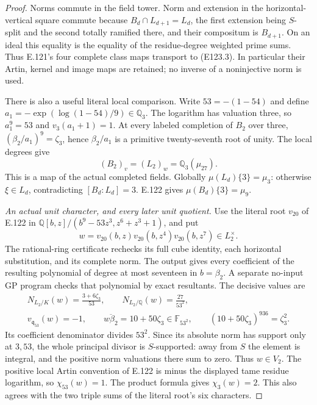 \begin{proof}
Norms commute in the field tower. Norm and extension in the
horizontal-vertical square commute because
$B_d\cap L_{d+1}=L_d$, the first extension being $S$-split
and the second totally ramified there, and their compositum is
$B_{d+1}$. On an ideal this equality is the equality of the
residue-degree weighted prime sums. Thus E.121's four complete
class maps transport to (E123.3). In particular their Artin,
kernel and image maps are retained; no inverse of a noninjective
norm is used.

There is also a useful literal local comparison. Write
$53=-(1-54)$ and define
$a_1=-\exp(\log(1-54)/9)\in\mathbb Q_3$.
The logarithm has valuation three, so $a_1^9=53$ and
$v_3(a_1+1)=1$. At every labeled completion of $B_2$ over three,
$(\beta_2/a_1)^9=\zeta_3$, hence $\beta_2/a_1$ is a primitive
twenty-seventh root of unity. The local degrees give
\[
            (B_2)_v=(L_2)_w=\mathbb Q_3(\mu_{27}).
 \tag{E123.16}
\]
This is a map of the actual completed fields. Globally
$\mu(L_d)\{3\}=\mu_3$: otherwise $\xi\in L_d$, contradicting
$[B_d:L_d]=3$. E.122 gives $\mu(B_d)\{3\}=\mu_9$.

\emph{An actual unit character, and every later unit quotient.}
Use the literal root $v_{20}$ of E.122 in
$\mathbb Q[b,z]/(b^9-53z^3,z^6+z^3+1)$, and put
\[
 w=v_{20}(b,z)v_{20}(b,z^4)v_{20}(b,z^7)\in L_2^\times.
 \tag{E123.17}
\]
The rational-ring certificate rechecks its full cube identity,
each horizontal substitution, and its complete norm. The output
gives every coefficient of the resulting polynomial of degree
at most seventeen in $b=\beta_2$. A separate no-input GP program
checks that polynomial by exact resultants. The decisive values are
\[
 \begin{gathered}
 N_{L_2/K}(w)=\frac{3+6\zeta_3}{53},\qquad
 N_{L_2/\mathbb Q}(w)=\frac{27}{53^2},\\
 v_{\mathfrak q_{53}}(w)=-1,\qquad
 \overline{w\beta_2}=10+50\zeta_3\in\mathbb F_{53^2},\qquad
 (10+50\zeta_3)^{936}=\zeta_3^2 .
 \end{gathered}
 \tag{E123.18}
\]
Its coefficient denominator divides $53^2$. Since its absolute
norm has support only at $3,53$, the whole principal divisor
is $S$-supported: away from $S$ the element is integral, and the
positive norm valuations there sum to zero. Thus $w\in V_2$.
The positive local Artin convention of E.122 is minus the
displayed tame residue logarithm, so $\chi_{53}(w)=1$.
The product formula gives $\chi_3(w)=2$. This also agrees with
the two triple sums of the literal root's six characters.


\end{proof}

